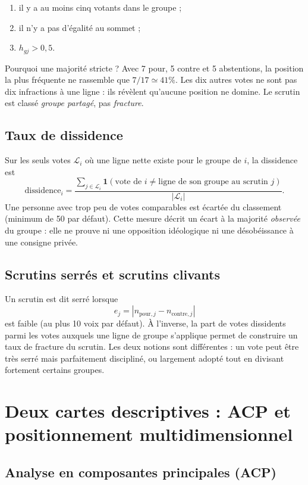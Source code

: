 \documentclass[11pt,a4paper]{article}
\newcommand{\ind}{\mathbf{1}}
\begin{document}
\begin{enumerate}
  \item il y a au moins cinq votants dans le groupe ;
  \item il n'y a pas d'égalité au sommet ;
  \item $h_{gj}>0{,}5$.
\end{enumerate}

Pourquoi une majorité stricte ? Avec 7 pour, 5 contre et 5 abstentions, la
position la plus fréquente ne rassemble que $7/17\simeq41\%$. Les dix autres
votes ne sont pas dix infractions à une ligne : ils révèlent qu'aucune position
ne domine. Le scrutin est classé \emph{groupe partagé}, pas \emph{fracture}.

\subsection{Taux de dissidence}

Sur les seuls votes $\mathcal L_i$ où une ligne nette existe pour le groupe de
$i$, la dissidence est
\[
 \mathrm{dissidence}_i=
 \frac{\sum_{j\in\mathcal L_i}\ind(\text{vote de $i$}\neq
 \text{ligne de son groupe au scrutin $j$})}{|\mathcal L_i|}.
\]
Une personne avec trop peu de votes comparables est écartée du classement
(minimum de 50 par défaut). Cette mesure décrit un écart à la majorité
\emph{observée} du groupe : elle ne prouve ni une opposition idéologique ni une
désobéissance à une consigne privée.

\subsection{Scrutins serrés et scrutins clivants}

Un scrutin est dit serré lorsque
\[
 e_j=|n_{\mathrm{pour},j}-n_{\mathrm{contre},j}|
\]
est faible (au plus 10 voix par défaut). À l'inverse, la part de votes dissidents
parmi les votes auxquels une ligne de groupe s'applique permet de construire un
taux de fracture du scrutin. Les deux notions sont différentes : un vote peut
être très serré mais parfaitement discipliné, ou largement adopté tout en
divisant fortement certains groupes.

\section{Deux cartes descriptives : ACP et positionnement multidimensionnel}

\subsection{Analyse en composantes principales (ACP)}
\end{document}

